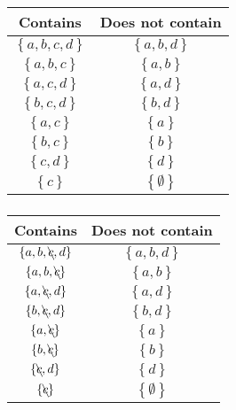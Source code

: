 \documentclass{article}
\begin{document}
\begin{tabular}{ | c | c | }
	\textbf{Contains}               & \textbf{Does not contain}      \\
	\hline
	$ \left\{ a, b, c, d \right\} $ & $ \left\{ a, b, d \right\} $   \\
	$ \left\{ a, b, c \right\} $    & $ \left\{ a, b \right\} $      \\
	$ \left\{ a, c, d \right\} $    & $ \left\{ a, d \right\} $      \\
	$ \left\{ b, c, d \right\} $    & $ \left\{ b, d \right\} $      \\
	$ \left\{ a, c \right\} $       & $ \left\{ a \right\} $         \\
	$ \left\{ b, c \right\} $       & $ \left\{ b \right\} $         \\
	$ \left\{ c, d \right\} $       & $ \left\{ d \right\}         $ \\
	$ \left\{ c \right\} $          & $ \left\{ \emptyset \right\} $ \\
\end{tabular}

\subsubsection{}

\begin{tabular}{ | c | c | }
	\textbf{Contains}                         & \textbf{Does not contain}      \\
	\hline
	$ \left\{ a, b, \bcancel{c}, d \right\} $ & $ \left\{ a, b, d \right\} $   \\
	$ \left\{ a, b, \bcancel{c} \right\} $    & $ \left\{ a, b \right\} $      \\
	$ \left\{ a, \bcancel{c}, d \right\} $    & $ \left\{ a, d \right\} $      \\
	$ \left\{ b, \bcancel{c}, d \right\} $    & $ \left\{ b, d \right\} $      \\
	$ \left\{ a, \bcancel{c} \right\} $       & $ \left\{ a \right\} $         \\
	$ \left\{ b, \bcancel{c} \right\} $       & $ \left\{ b \right\} $         \\
	$ \left\{ \bcancel{c}, d \right\} $       & $ \left\{ d \right\}         $ \\
	$ \left\{ \bcancel{c} \right\} $          & $ \left\{ \emptyset \right\} $ \\
\end{tabular}
\end{document}

